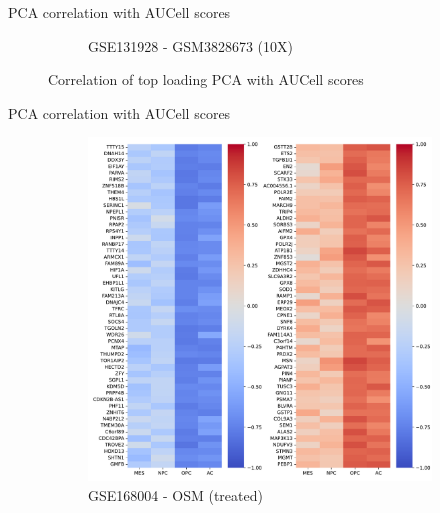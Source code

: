 \documentclass[aspectratio=169,9pt]{beamer}
\begin{document}
\begin{frame}{PCA correlation with AUCell scores}
\begin{adjustwidth}{-5cm}{-5cm}
\begin{figure}
\begin{subfigure}[b]{0.38\textwidth}
                    \caption{GSE131928 - GSM3828673 (10X)}
                \end{subfigure}
                \caption{Correlation of top loading PCA with AUCell scores}
            \end{figure}
        \end{adjustwidth}
    \end{frame}

    \begin{frame}{PCA correlation with AUCell scores}
        \begin{adjustwidth}{-5cm}{-5cm}
            \centering
            \begin{figure}\ContinuedFloat
                \centering
                \begin{subfigure}[b]{0.38\textwidth}
                    \centering
                    \includegraphics[width=\textwidth]{OSM_celllines_load-corr}
                    \caption{GSE168004 - OSM (treated)}
                \end{subfigure}
                \begin{subfigure}[b]{0.38\textwidth}
                    \centering

\end{subfigure}
\end{figure}
\end{adjustwidth}
\end{frame}
\end{document}

